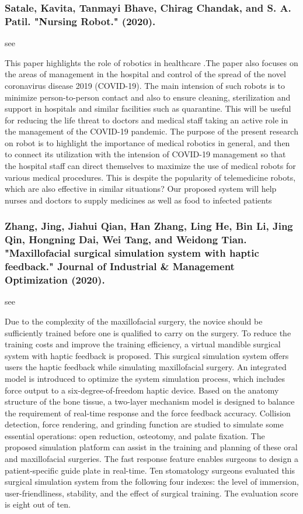 \documentclass[conference]{IEEEtran}
\begin{document}
\medskip
\subsubsection{Satale, Kavita, Tanmayi Bhave, Chirag Chandak, and S. A. Patil. "Nursing Robot." (2020).}
see \cite{satale2020nursing}

This paper highlights the role of robotics in healthcare .The paper also focuses on the areas of management in the hospital and control of the spread of the novel coronavirus disease 2019 (COVID-19). The main intension of such robots is to minimize person-to-person contact and also to ensure cleaning, sterilization and support in hospitals and similar facilities such as quarantine. This will be useful for reducing the life threat to doctors and medical staff taking an active role in the management of the COVID-19 pandemic. The purpose of the present research on robot is to highlight the importance of medical robotics in general, and then to connect its utilization with the intension of COVID-19 management so that the hospital staff can direct themselves to maximize the use of medical robots for various medical procedures. This is despite the popularity of telemedicine robots, which are also effective in similar situations? Our proposed system will help nurses and doctors to supply medicines as well as food to infected patients

\medskip
\subsubsection{Zhang, Jing, Jiahui Qian, Han Zhang, Ling He, Bin Li, Jing Qin, Hongning Dai, Wei Tang, and Weidong Tian. "Maxillofacial surgical simulation system with haptic feedback." Journal of Industrial \& Management Optimization (2020).}
see \cite{zhang2020maxillofacial}

Due to the complexity of the maxillofacial surgery, the novice should be sufficiently trained before one is qualified to carry on the surgery. To reduce the training costs and improve the training efficiency, a virtual mandible surgical system with haptic feedback is proposed. This surgical simulation system offers users the haptic feedback while simulating maxillofacial surgery. An integrated model is introduced to optimize the system simulation process, which includes force output to a six-degree-of-freedom haptic device. Based on the anatomy structure of the bone tissue, a two-layer mechanism model is designed to balance the requirement of real-time response and the force feedback accuracy. Collision detection, force rendering, and grinding function are studied to simulate some essential operations: open reduction, osteotomy, and palate fixation. The proposed simulation platform can assist in the training and planning of these oral and maxillofacial surgeries. The fast response feature enables surgeons to design a patient-specific guide plate in real-time. Ten stomatology surgeons evaluated this surgical simulation system from the following four indexes: the level of immersion, user-friendliness, stability, and the effect of surgical training. The evaluation score is eight out of ten.
\end{document}
